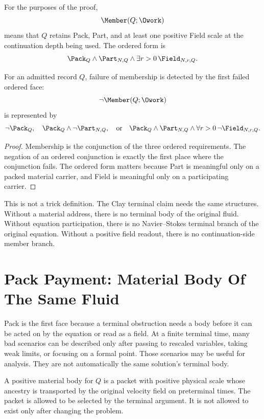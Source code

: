 \begin{definition}[Membership]
For the purposes of the proof,
\[
  \Member(Q;\Owork)
\]
means that \(Q\) retains Pack, Part, and at least one positive Field scale at the continuation depth being used.
The ordered form is
\[
  \Pack_Q\wedge\Part_{N,Q}\wedge \exists r>0\,\Field_{N,r,Q}.
\]
\end{definition}

\begin{proposition}
For an admitted record \(Q\), failure of membership is detected by the first failed ordered face:
\[
\neg\Member(Q;\Owork)
\]
is represented by
\[
\neg\Pack_Q,
\quad
\Pack_Q\wedge\neg\Part_{N,Q},
\quad\text{or}\quad
\Pack_Q\wedge\Part_{N,Q}\wedge\forall r>0\,\neg\Field_{N,r,Q}.
\]
\end{proposition}

\begin{proof}
Membership is the conjunction of the three ordered requirements.
The negation of an ordered conjunction is exactly the first place where the conjunction fails.
The ordered form matters because Part is meaningful only on a packed material carrier, and Field is meaningful only on a participating carrier.
\end{proof}

This is not a trick definition.
The Clay terminal claim needs the same structures.
Without a material address, there is no terminal body of the original fluid.
Without equation participation, there is no Navier--Stokes terminal branch of the original equation.
Without a positive field readout, there is no continuation-side member branch.

\section{Pack Payment: Material Body Of The Same Fluid}

Pack is the first face because a terminal obstruction needs a body before it can be acted on by the equation or read as a field.
At a finite terminal time, many bad scenarios can be described only after passing to rescaled variables, taking weak limits, or focusing on a formal point.
Those scenarios may be useful for analysis.
They are not automatically the same solution's terminal body.

\begin{definition}
A positive material body for \(Q\) is a packet with positive physical scale whose ancestry is transported by the original velocity field on preterminal times.
The packet is allowed to be selected by the terminal argument.
It is not allowed to exist only after changing the problem.
\end{definition}

